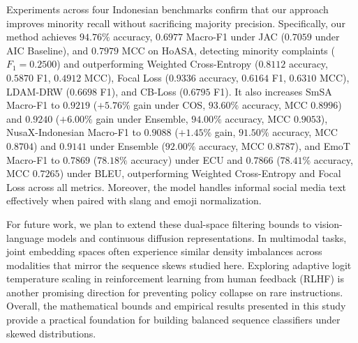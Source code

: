 \documentclass[10pt,journal,compsoc]{IEEEtran}
\begin{document}
Experiments across four Indonesian benchmarks confirm that our approach improves minority recall without sacrificing majority precision. Specifically, our method achieves $94.76\%$ accuracy, $0.6977$ Macro-F1 under JAC ($0.7059$ under AIC Baseline), and $0.7979$ MCC on HoASA, detecting minority complaints ($F_1 = 0.2500$) and outperforming Weighted Cross-Entropy ($0.8112$ accuracy, $0.5870$ F1, $0.4912$ MCC), Focal Loss ($0.9336$ accuracy, $0.6164$ F1, $0.6310$ MCC), LDAM-DRW ($0.6698$ F1), and CB-Loss ($0.6795$ F1). It also increases SmSA Macro-F1 to \textbf{$0.9219$} ($+5.76\%$ gain under COS, $93.60\%$ accuracy, MCC $0.8996$) and \textbf{$0.9240$} ($+6.00\%$ gain under Ensemble, $94.00\%$ accuracy, MCC $0.9053$), NusaX-Indonesian Macro-F1 to \textbf{$0.9088$} ($+1.45\%$ gain, $91.50\%$ accuracy, MCC $0.8704$) and \textbf{$0.9141$} under Ensemble ($92.00\%$ accuracy, MCC $0.8787$), and EmoT Macro-F1 to \textbf{$0.7869$} ($78.18\%$ accuracy) under ECU and \textbf{$0.7866$} ($78.41\%$ accuracy, MCC $0.7265$) under BLEU, outperforming Weighted Cross-Entropy and Focal Loss across all metrics. Moreover, the model handles informal social media text effectively when paired with slang and emoji normalization.

For future work, we plan to extend these dual-space filtering bounds to vision-language models and continuous diffusion representations. In multimodal tasks, joint embedding spaces often experience similar density imbalances across modalities that mirror the sequence skews studied here. Exploring adaptive logit temperature scaling in reinforcement learning from human feedback (RLHF) is another promising direction for preventing policy collapse on rare instructions. Overall, the mathematical bounds and empirical results presented in this study provide a practical foundation for building balanced sequence classifiers under skewed distributions.



\end{document}
